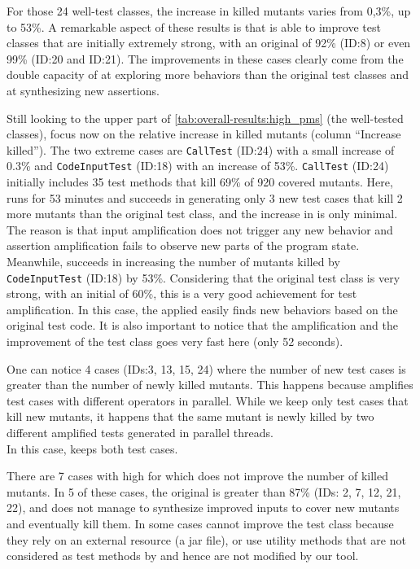 For those 24 well-test classes, the increase in killed mutants varies from 0,3\%, up to 53\%.
A remarkable aspect of these results is that \dspot is able to improve test classes that are initially extremely strong, with an original \ms of 92\% (ID:8) or even 99\% (ID:20 and ID:21). 
The improvements in these cases clearly come from the double capacity of \dspot at exploring more behaviors than the original test classes and at synthesizing new assertions.

Still looking to the upper part of \autoref{tab:overall-results:high_pms} (the well-tested classes), focus now on the relative increase in killed mutants (column ``Increase killed''). 
The two extreme cases are \texttt{CallTest} (ID:24) with a small increase of 0.3\% and \texttt{CodeInputTest} (ID:18) with an increase of 53\%.
\texttt{CallTest} (ID:24) initially includes 35 test methods that kill 69\% of 920 covered mutants. 
Here, \dspot runs for 53 minutes and succeeds in generating only 3 new test cases that kill 2 more mutants than the original test class, and the increase in \ms is only minimal. 
The reason is that input amplification does not trigger any new behavior and assertion amplification fails to observe new parts of the program state. 
Meanwhile, \dspot succeeds in increasing the number of mutants killed by \texttt{CodeInputTest} (ID:18) by 53\%.
Considering that the original test class is very strong, with an initial \ms of 60\%, this is a very good achievement for test amplification. 
In this case, the \Iampl applied easily finds new behaviors based on the original test code.
It is also important to notice that the amplification and the improvement of the test class goes very fast here (only 52 seconds). 

One can notice 4 cases (IDs:3, 13, 15, 24) where the number of new test cases is greater than the number of newly killed mutants. 
This happens because \dspot{} amplifies test cases with different operators in parallel. 
While we keep only test cases that kill new mutants, it happens that the same mutant is newly killed by two different amplified tests generated in parallel threads. \\
In this case, \dspot{} keeps both test cases.

There are 7 cases with high \ms for which \dspot{} does not improve the number of killed mutants. 
In 5 of these cases, the original \ms is greater than 87\% (IDs: 2, 7, 12, 21, 22), and \dspot does not manage to synthesize improved inputs to cover new mutants and eventually kill them.
In some cases \dspot cannot improve the test class because they rely on an external resource (a jar file), or use utility methods that are not considered as test methods by \dspot and hence are not modified by our tool.

